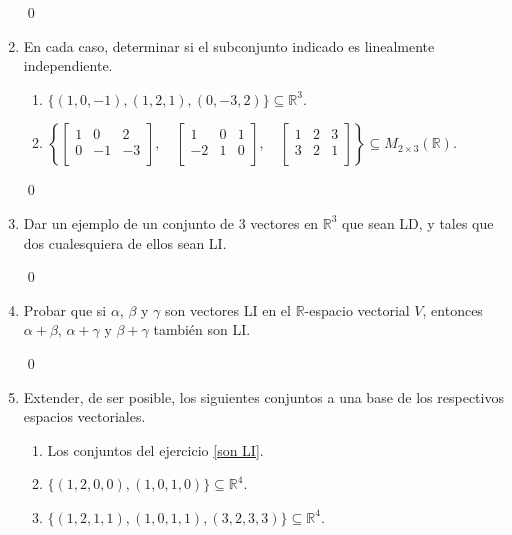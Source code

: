 \begin{enumerate}[resume, topsep=6pt, itemsep=.4cm]
    
    \rta 

    \qed     
    
    \item\label{son LI} En cada caso, determinar si el subconjunto indicado es linealmente independiente.
    \begin{enumerate}
        \item $\{ (1,0,-1), (1,2,1), (0,-3,2) \}\subseteq \mathbb{R}^3$.
        \item $\left\{  \begin{bmatrix} 1 & 0 & 2 \\ 0 & -1 & -3 \\ \end{bmatrix}, \quad
        \begin{bmatrix} 1 & 0 & 1 \\ -2 & 1 & 0 \\ \end{bmatrix}, \quad
        \begin{bmatrix} 1 & 2 & 3 \\ 3 & 2 & 1 \\ \end{bmatrix} \right\}\subseteq M_{2\times 3}(\mathbb{R})$.
    \end{enumerate}
    
    
    \rta 

    \qed     
    
    \item Dar un ejemplo de un conjunto de 3 vectores en $\mathbb{R}^3$ que sean LD, y tales que dos cualesquiera de ellos sean LI.
    
    
    \rta 

    \qed     
    
    \item  Probar que si $\alpha$, $\beta$ y $\gamma$ son vectores LI en el $\mathbb{R}$-espacio vectorial $V$, entonces $\alpha +\beta$, $\alpha +\gamma$ y $\beta +\gamma $ también son LI.
    
    
    \rta 

    \qed     
    
    \item Extender, de ser posible, los siguientes conjuntos a una base de los respectivos espacios vectoriales.
    
    \begin{enumerate}
        \item Los conjuntos del ejercicio \ref{son LI}.
        \item\label{10b} $\{ (1,2,0,0),(1,0,1,0) \}\subseteq\mathbb{R}^4$.
        \item\label{10c} $\{ (1,2,1,1),(1,0,1,1),(3,2,3,3)\}\subseteq\mathbb{R}^4$.
    \end{enumerate}
    

\end{enumerate}
